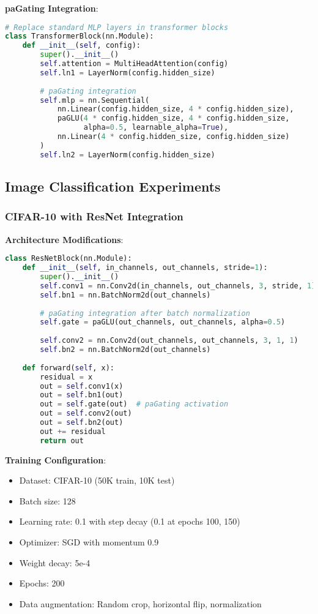 \documentclass[journal]{IEEEtran}
\begin{document}
\textbf{paGating Integration}:
\begin{lstlisting}[language=python]
# Replace standard MLP layers in transformer blocks
class TransformerBlock(nn.Module):
    def __init__(self, config):
        super().__init__()
        self.attention = MultiHeadAttention(config)
        self.ln1 = LayerNorm(config.hidden_size)
        
        # paGating integration
        self.mlp = nn.Sequential(
            nn.Linear(config.hidden_size, 4 * config.hidden_size),
            paGLU(4 * config.hidden_size, 4 * config.hidden_size, 
                  alpha=0.5, learnable_alpha=True),
            nn.Linear(4 * config.hidden_size, config.hidden_size)
        )
        self.ln2 = LayerNorm(config.hidden_size)
\end{lstlisting}

\subsection{Image Classification Experiments}

\subsubsection{CIFAR-10 with ResNet Integration}
\textbf{Architecture Modifications}:
\begin{lstlisting}[language=python]
class ResNetBlock(nn.Module):
    def __init__(self, in_channels, out_channels, stride=1):
        super().__init__()
        self.conv1 = nn.Conv2d(in_channels, out_channels, 3, stride, 1)
        self.bn1 = nn.BatchNorm2d(out_channels)
        
        # paGating integration after batch normalization
        self.gate = paGLU(out_channels, out_channels, alpha=0.5)
        
        self.conv2 = nn.Conv2d(out_channels, out_channels, 3, 1, 1)
        self.bn2 = nn.BatchNorm2d(out_channels)
        
    def forward(self, x):
        residual = x
        out = self.conv1(x)
        out = self.bn1(out)
        out = self.gate(out)  # paGating activation
        out = self.conv2(out)
        out = self.bn2(out)
        out += residual
        return out
\end{lstlisting}

\textbf{Training Configuration}:
\begin{itemize}
    \item Dataset: CIFAR-10 (50K train, 10K test)
    \item Batch size: 128
    \item Learning rate: 0.1 with step decay (0.1 at epochs 100, 150)
    \item Optimizer: SGD with momentum 0.9
    \item Weight decay: 5e-4
    \item Epochs: 200
    \item Data augmentation: Random crop, horizontal flip, normalization
\end{itemize}
\end{document}
